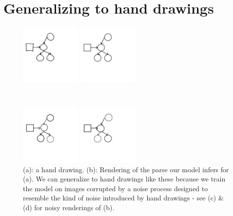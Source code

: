 \documentclass{article}
\begin{document}
\section{Generalizing to hand drawings}

\begin{figure}
  \begin{minipage}[b]{0.3\textwidth}
    \centering\includegraphics[width = 3cm]{figures/expert-60.png}
  \end{minipage}%
  \begin{minipage}[t]{0.3\textwidth}\includegraphics[width = 3cm]{figures/60-groundTruth.png}
  \end{minipage}\\
  \begin{minipage}[t]{0.3\textwidth}\includegraphics[width = 3cm]{figures/60-1.png}
  \end{minipage}%
  \begin{minipage}[t]{0.3\textwidth}\includegraphics[width = 3cm]{figures/60-2.png}
  \end{minipage}
  \caption{(a): a hand drawing. (b): Rendering of the parse our model infers for (a). We can generalize to hand drawings like these because we train the model on images corrupted by a noise process designed to resemble the kind of noise introduced by hand drawings - see (c) \& (d) for noisy renderings of (b).}
  \end{figure}
\end{document}
